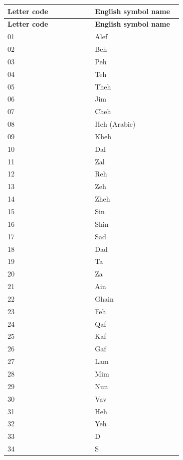 \documentclass[11pt,a4paper]{article}
\begin{document}
\begingroup\small\setlength{\tabcolsep}{3pt}\renewcommand{\arraystretch}{1.2}
\begin{longtable}{@{}p{0.4775\linewidth}p{0.4775\linewidth}@{}}
\toprule
\textbf{Letter code} & \textbf{English symbol name} \\ \midrule
\endfirsthead
\textbf{Letter code} & \textbf{English symbol name} \\ \midrule \endhead
01 & Alef \\
02 & Beh \\
03 & Peh \\
04 & Teh \\
05 & Theh \\
06 & Jim \\
07 & Cheh \\
08 & Heh (Arabic) \\
09 & Kheh \\
10 & Dal \\
11 & Zal \\
12 & Reh \\
13 & Zeh \\
14 & Zheh \\
15 & Sin \\
16 & Shin \\
17 & Sad \\
18 & Dad \\
19 & Ta \\
20 & Za \\
21 & Ain \\
22 & Ghain \\
23 & Feh \\
24 & Qaf \\
25 & Kaf \\
26 & Gaf \\
27 & Lam \\
28 & Mim \\
29 & Nun \\
30 & Vav \\
31 & Heh \\
32 & Yeh \\
33 & D \\
34 & S \\
\bottomrule\end{longtable}\endgroup
\end{document}
